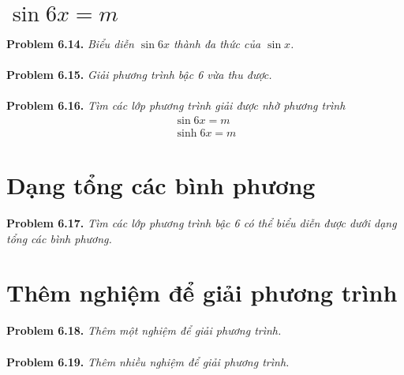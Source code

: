 \documentclass[a4paper,oneside]{book}
\numberwithin{equation}{chapter}
\begin{document}
\section{$\sin 6x = m$}
\textbf{Problem 6.14.} \textit{Biểu diễn $\sin 6x$ thành đa thức của $\sin x$.}\\
\\
\textbf{Problem 6.15.} \textit{Giải phương trình bậc 6 vừa thu được.}\\
\\
\textbf{Problem 6.16.} \textit{Tìm các lớp phương trình giải được nhờ phương trình}
\begin{align}
\sin 6x = m\\
\sinh 6x = m
\end{align}
\section{Dạng tổng các bình phương}
\textbf{Problem 6.17.} \textit{Tìm các lớp phương trình bậc 6 có thể biểu diễn được dưới dạng tổng các bình phương.}
\section{Thêm nghiệm để giải phương trình}
\textbf{Problem 6.18.} \textit{Thêm một nghiệm để giải phương trình.}\\
\\
\textbf{Problem 6.19.} \textit{Thêm nhiều nghiệm để giải phương trình.}
\end{document}
